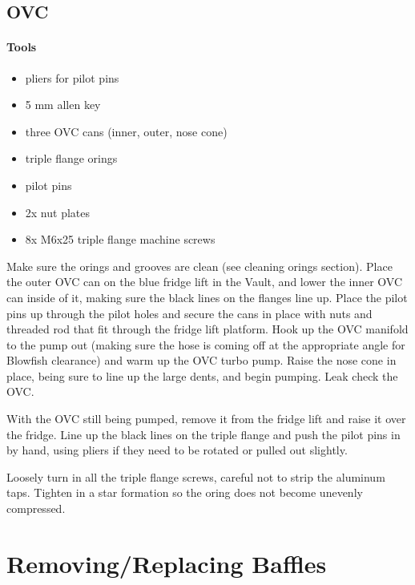 \subsection{OVC}

\paragraph{Tools}
\begin{itemize}
 \item pliers for pilot pins
\item 5 mm allen key
\item three OVC cans (inner, outer, nose cone)
\item triple flange orings
\item pilot pins
\item 2x nut plates
\item 8x M6x25 triple flange machine screws
\end{itemize}

Make sure the orings and grooves are clean (see cleaning orings section).  Place the outer OVC can on the blue fridge lift in the Vault, and lower the inner OVC can inside of it, making sure the black lines on the flanges line up.  Place the pilot pins up through the pilot holes and secure the cans in place with nuts and threaded rod that fit through the fridge lift platform.  Hook up the OVC manifold to the pump out (making sure the hose is coming off at the appropriate angle for Blowfish clearance) and warm up the OVC turbo pump.  Raise the nose cone in place, being sure to line up the large dents, and begin pumping.  Leak check the OVC.


With the OVC still being pumped, remove it from the fridge lift and raise it over the fridge.  Line up the black lines on the triple flange and push the pilot pins in by hand, using pliers if they need to be rotated or pulled out slightly.


Loosely turn in all the triple flange screws, careful not to strip the aluminum taps.  Tighten in a star formation so the oring does not become unevenly compressed.

\section{Removing/Replacing \het{} Baffles}